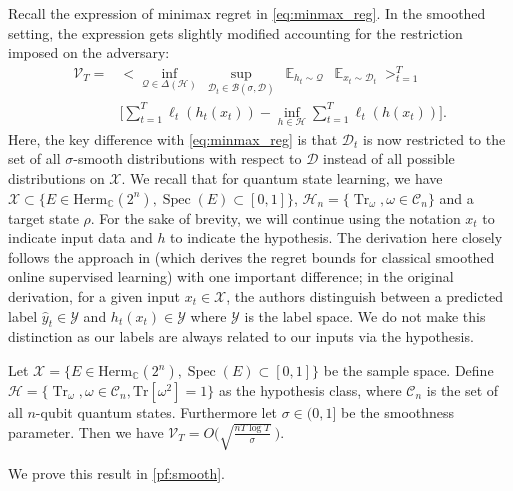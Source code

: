 Recall the expression of minimax regret in \cref{eq:minmax_reg}. In the smoothed setting, the expression gets slightly modified accounting for the restriction imposed on the adversary:
\begin{equation}
\begin{aligned}
    \label{eq:minmax_reg_smooth}
     \mathcal{V}_T =& \Big< \inf_{\mathcal{Q} \in \Delta(\mathcal{H})} \  \sup_{\mathcal{D}_t \in \mathcal{B}(\sigma, \mathcal{D})} \  \mathop{\mathbb{E}}_{h_t \sim \mathcal{Q}} \  \mathop{\mathbb{E}}_{x_t \sim \mathcal{D}_t} \Big>_{t=1}^T \\&\Big[ \sum_{t=1}^T \ell_t (h_t (x_t)) - \inf_{h \in \mathcal{H}} \sum_{t=1}^T \ell_t(h(x_t)) \Big].
     \end{aligned}
\end{equation}
Here, the key difference with \cref{eq:minmax_reg} is that $\mathcal{D}_t$ is now restricted to the set of all $\sigma$-smooth distributions with respect to $\mathcal{D}$ instead of all possible distributions on $\mathcal{X}$. We recall that for quantum state learning, we have $\mathcal{X} \subset \{E\in\mathrm{Herm}_{\mathbb{C}}(2^n), \operatorname{Spec}(E)\subset[0,1]\}$, $\mathcal{H}_n=\{\operatorname{Tr}_\omega, \omega\in\mathcal C_n\}$ and a target state $\rho$. For the sake of brevity, we will continue using the notation $x_t$ to indicate input data and $h$ to indicate the hypothesis. The derivation here closely follows the approach in \citet{block2022smoothed} (which derives the regret bounds for classical smoothed online supervised learning)  with one important difference; in the original derivation, for a given input $x_t \in \mathcal{X}$, the authors distinguish between a predicted label $\hat{y}_t \in \mathcal{Y}$ and $h_t(x_t) \in \mathcal{Y}$ where $\mathcal{Y}$ is the label space. We do not make this distinction as our labels are always related to our inputs via the hypothesis. 

 

\begin{theorem}
\label{theo:smooth_ub}
 Let $\mathcal{X} = \{E\in\mathrm{Herm}_{\mathbb{C}}(2^n), \operatorname{Spec}(E)\subset[0,1]\}$ be the sample space. Define $\mathcal{H}=\{\operatorname{Tr}_\omega, \omega\in\mathcal C_n, \mathrm{Tr}[\omega^2]=1\}$ as the hypothesis class, where $\mathcal{C}_n$ is the set of all $n$-qubit quantum states.  Furthermore let $\sigma \in (0,1]$ be the smoothness parameter. Then we have $\mathcal{V}_T = O\Bigg(\sqrt{\frac{nT \log T}{\sigma}} \ \Bigg).$
\end{theorem}

We prove this result in \cref{pf:smooth}.